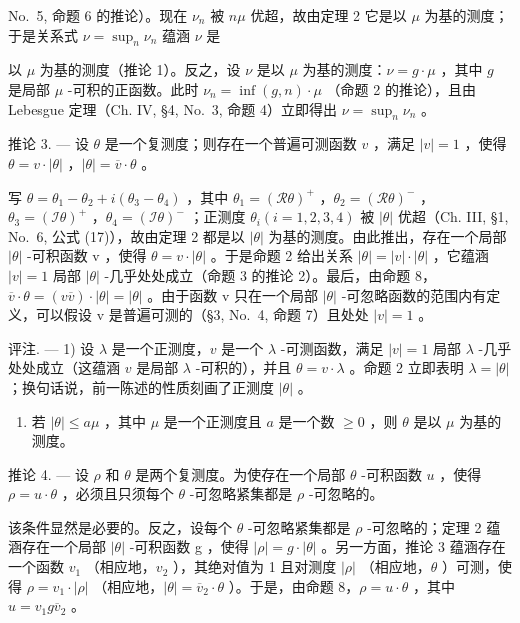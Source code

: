 No.~5, 命题 6 的推论）。现在 \(\nu_{n}\) 被 \(n\mu\) 优超，故由定理 2 它是以 \(\mu\) 为基的测度；于是关系式 \(\nu = \sup_{n} \nu_{n}\) 蕴涵 \(\nu\) 是

以 \(\mu\) 为基的测度（推论 1）。反之，设 \(\nu\) 是以 \(\mu\) 为基的测度：\(\nu = g \cdot \mu\) ，其中 \(g\) 是局部 \(\mu\) -可积的正函数。此时 \(\nu_n = \inf(g, n) \cdot \mu\) （命题 2 的推论），且由 Lebesgue 定理（Ch. IV, §4, No.~3, 命题 4）立即得出 \(\nu = \sup_{n} \nu_n\) 。

推论 3. --- 设 \(\theta\) 是一个复测度；则存在一个普遍可测函数 \(v\) ，满足 \(|v| = 1\) ，使得 \(\theta = v \cdot |\theta|\) ，\(|\theta| = \overline{v} \cdot \theta\) 。

写 \(\theta = \theta_{1} - \theta_{2} + i(\theta_{3} - \theta_{4})\) ，其中 \(\theta_{1} = (\mathcal{R}\theta)^{+}\) ，\(\theta_{2} = (\mathcal{R}\theta)^{-}\) ，\(\theta_{3} = (\mathcal{I}\theta)^{+}\) ，\(\theta_{4} = (\mathcal{I}\theta)^{-}\) ；正测度 \(\theta_{i} (i = 1, 2, 3, 4)\) 被 \(|\theta|\) 优超（Ch. III, §1, No.~6, 公式 (17)），故由定理 2 都是以 \(|\theta|\) 为基的测度。由此推出，存在一个局部 \(|\theta|\) -可积函数 v ，使得 \(\theta = v \cdot |\theta|\) 。于是命题 2 给出关系 \(|\theta| = |v| \cdot |\theta|\) ，它蕴涵 \(|v| = 1\) 局部 \(|\theta|\) -几乎处处成立（命题 3 的推论 2）。最后，由命题 8，\(\overline{v} \cdot \theta = (v\overline{v}) \cdot |\theta| = |\theta|\) 。由于函数 v 只在一个局部 \(|\theta|\) -可忽略函数的范围内有定义，可以假设 v 是普遍可测的（§3, No.~4, 命题 7）且处处 \(|v| = 1\) 。

评注. --- 1) 设 \(\lambda\) 是一个正测度，\(v\) 是一个 \(\lambda\) -可测函数，满足 \(|v| = 1\) 局部 \(\lambda\) -几乎处处成立（这蕴涵 \(v\) 是局部 \(\lambda\) -可积的），并且 \(\theta = v \cdot \lambda\) 。命题 2 立即表明 \(\lambda = |\theta|\) ；换句话说，前一陈述的性质刻画了正测度 \(|\theta|\) 。

\begin{enumerate}
\def\labelenumi{\arabic{enumi})}
\setcounter{enumi}{1}
\tightlist
\item
  若 \(|\theta| \leqslant a\mu\) ，其中 \(\mu\) 是一个正测度且 \(a\) 是一个数 \(\geqslant 0\) ，则 \(\theta\) 是以 \(\mu\) 为基的测度。
\end{enumerate}

推论 4. --- 设 \(\rho\) 和 \(\theta\) 是两个复测度。为使存在一个局部 \(\theta\) -可积函数 \(u\) ，使得 \(\rho = u \cdot \theta\) ，必须且只须每个 \(\theta\) -可忽略紧集都是 \(\rho\) -可忽略的。

该条件显然是必要的。反之，设每个 \(\theta\) -可忽略紧集都是 \(\rho\) -可忽略的；定理 2 蕴涵存在一个局部 \(|\theta|\) -可积函数 g ，使得 \(|\rho| = g \cdot |\theta|\) 。另一方面，推论 3 蕴涵存在一个函数 \(v_{1}\) （相应地，\(v_{2}\) ），其绝对值为 1 且对测度 \(|\rho|\) （相应地，\(\theta\) ）可测，使得 \(\rho = v_{1} \cdot |\rho|\) （相应地，\(|\theta| = \overline{v}_{2} \cdot \theta\) ）。于是，由命题 8，\(\rho = u \cdot \theta\) ，其中 \(u = v_{1}g\overline{v}_{2}\) 。

